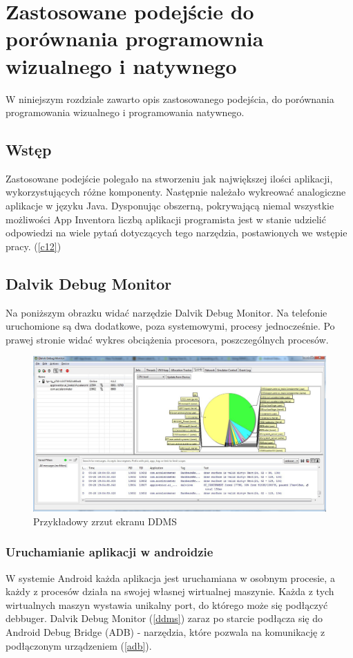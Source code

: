 \chapter{Zastosowane podejście do porównania programownia wizualnego i natywnego}
\label{c4}

W niniejszym rozdziale zawarto opis zastosowanego podejścia, do porównania programowania wizualnego i programowania natywnego.

\section{Wstęp}
\label{c41}

Zastosowane podejście polegało na stworzeniu jak największej ilości aplikacji, wykorzystujących różne komponenty. Następnie należało wykreować analogiczne aplikacje w języku Java. Dysponując obszerną, pokrywającą niemal wszystkie możliwości App Inventora  liczbą aplikacji programista jest w stanie udzielić odpowiedzi na wiele pytań dotyczących tego narzędzia, postawionych we wstępie pracy. (\ref{c12})

\section{Dalvik Debug Monitor}

Na poniższym obrazku widać narzędzie Dalvik Debug Monitor. Na telefonie uruchomione są dwa dodatkowe, poza systemowymi, procesy jednocześnie. Po prawej stronie widać wykres obciążenia procesora, poszczególnych procesów.

\begin{figure}[H] 
\centering\includegraphics[width=12cm]{figures/dalvik}
\caption{Przykładowy zrzut ekranu DDMS}
\end{figure}



\subsection{Uruchamianie aplikacji w androidzie}
W systemie Android każda aplikacja jest uruchamiana w osobnym procesie, a każdy z procesów działa na swojej własnej wirtualnej maszynie. Każda z tych wirtualnych maszyn wystawia unikalny port, do którego może się podłączyć debbuger. Dalvik Debug Monitor (\ref{ddms}) zaraz po starcie podłącza się do Android Debug Bridge (ADB) - narzędzia, które pozwala na komunikację z podłączonym urządzeniem (\ref{adb}).

